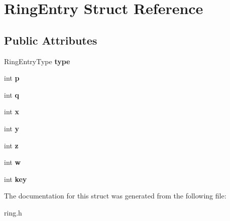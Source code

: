 \hypertarget{structRingEntry}{}\section{Ring\+Entry Struct Reference}
\label{structRingEntry}
\subsection*{Public Attributes}
\begin{DoxyCompactItemize}
\item 
\mbox{\label{structRingEntry_afc77cc123c354240feba6e92dd4ee882}} 
Ring\+Entry\+Type {\bfseries type}
\item 
\mbox{\label{structRingEntry_a8b01eb77bb24ee7243b3c4966475f5d1}} 
int {\bfseries p}
\item 
\mbox{\label{structRingEntry_ae944a4f58e8d867035a9d94366615ff2}} 
int {\bfseries q}
\item 
\mbox{\label{structRingEntry_a1d73e65971815248e917087ca69afd63}} 
int {\bfseries x}
\item 
\mbox{\label{structRingEntry_a7f50629b87d74360c6726903cf1452d2}} 
int {\bfseries y}
\item 
\mbox{\label{structRingEntry_a8b88d0f404a59333eae214698675c712}} 
int {\bfseries z}
\item 
\mbox{\label{structRingEntry_a5c4cd66b932f7f6c430b12b9b6dc4007}} 
int {\bfseries w}
\item 
\mbox{\label{structRingEntry_a94645a5a7b12ad82ed76dce5fd5e1f2c}} 
int {\bfseries key}
\end{DoxyCompactItemize}


The documentation for this struct was generated from the following file\+:\begin{DoxyCompactItemize}
\item 
ring.\+h\end{DoxyCompactItemize}
